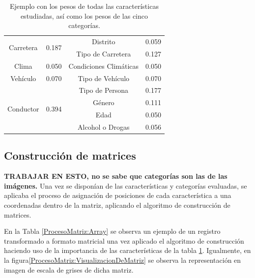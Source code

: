 \documentclass{uathesis-es}
\begin{document}
{\begin{table}[ht]
\begin{tabular}{ |c|c||c|c| }
        \multirow{2}{*}{Carretera} & \multirow{2}{*}{0.187} & Distrito  & 0.059\\      
        &  & Tipo de Carretera & 0.127\\
        \hline
        
        \multirow{1}{*}{Clima}  & \multirow{1}{*}{0.050}  & Condiciones Climáticas  & 0.050\\
        \hline
        
        \multirow{1}{*}{Vehículo}  & \multirow{1}{*}{0.070} & Tipo de Vehículo  & 0.070\\
        \hline
        
        \multirow{4}{*}{Conductor}   & \multirow{4}{*}{0.394} & Tipo de Persona & 0.177\\
        &      & Género      & 0.111\\
        &      & Edad      & 0.050\\
        &      & Alcohol o Drogas  & 0.056\\
        \hline
        
    \end{tabular}
    \caption{Ejemplo con los pesos de todas las características estudiadas, así como los pesos de las cinco categorías.}
    \label{1stPaperWeightsFinalCharacteristics}
\end{table}

\subsection*{Construcción de matrices}

\textbf{TRABAJAR EN ESTO, no se sabe que categorías son las de las imágenes.}
Una vez se disponían de las características y categorías evaluadas, se aplicaba el proceso de asignación de posiciones de cada característica a una coordenadas dentro de la matriz, aplicando el algoritmo de construcción de matrices.

En la Tabla \ref{ProcesoMatriz:Array} se observa un ejemplo de un registro transformado a formato matricial una vez aplicado el algoritmo de construcción haciendo uso de la importancia de las características de la tabla \ref{1stPaperWeightsFinalCharacteristics}. Igualmente, en la figura\ref{ProcesoMatriz:VisualizacionDeMatriz} se observa la representación en imagen de escala de grises de dicha matriz.

}
\end{document}
